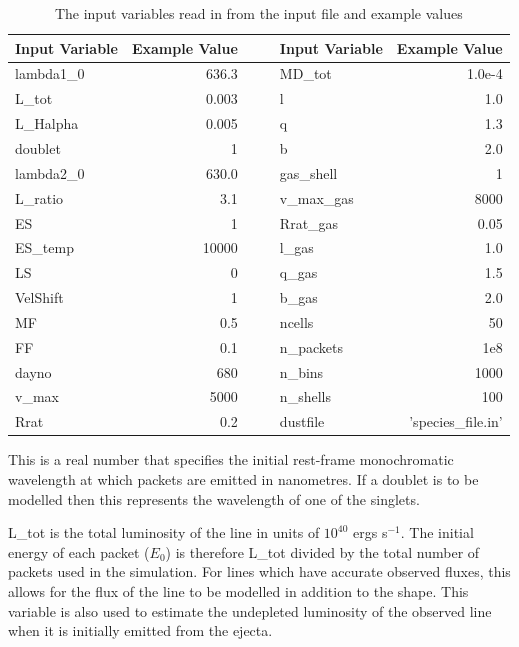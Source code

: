 	\begin{table}[htdp]
\caption{The input variables read in from the input file and example values}
\begin{center}
\begin{tabular}{l r c|c l r}
\hline
Input Variable & Example Value &&& Input Variable & Example Value\\
\hline
lambda1\_0 & 636.3 &&& MD\_tot & 1.0e-4\\
L\_tot & 0.003 &&& l & 1.0\\
L\_Halpha & 0.005 &&& q & 1.3\\
doublet & 1 &&& b & 2.0\\
lambda2\_0 & 630.0 &&& gas\_shell & 1\\
L\_ratio & 3.1&&& v\_max\_gas & 8000\\
ES & 1 &&& Rrat\_gas & 0.05\\
ES\_temp & 10000 &&& l\_gas & 1.0\\
LS & 0 &&& q\_gas & 1.5\\
VelShift & 1 &&& b\_gas & 2.0\\
MF & 0.5 &&& ncells & 50\\
FF & 0.1 &&& n\_packets & 1e8\\
dayno & 680 &&& n\_bins & 1000\\
v\_max & 5000 &&& n\_shells & 100\\
Rrat & 0.2 &&& dustfile & 'species\_file.in'\\
\hline
\end{tabular}
\end{center}
\label{tbl:input}
\end{table}%


 This is a real number that specifies the initial rest-frame monochromatic wavelength at which packets are emitted in nanometres.  If a doublet is to be modelled then this represents the wavelength of one of the singlets.


 L\_tot is the total luminosity of the line in units of $10^{40}$ ergs s$^{-1}$.  The initial energy of each packet ($E_0$) is therefore L\_tot divided by the total number of packets used in the simulation. For lines which have accurate observed fluxes, this allows for the flux of the line to be modelled in addition to the shape.  This variable is also used to estimate the undepleted luminosity of the observed line when it is initially emitted from the ejecta.

